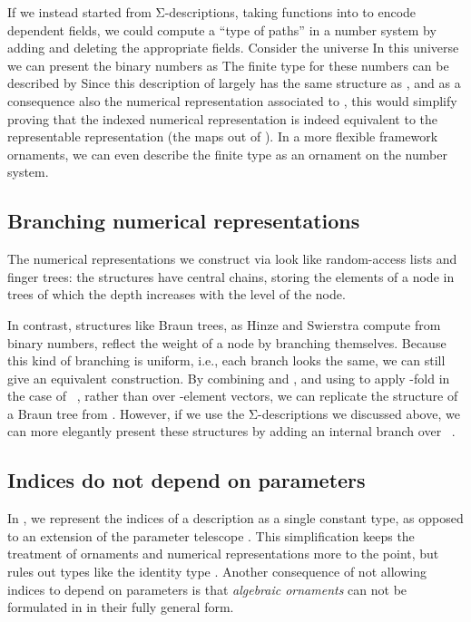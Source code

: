 If we instead started from Σ-descriptions, taking functions into  to encode dependent fields, we could compute a ``type of paths'' in a number system by adding and deleting the appropriate fields. Consider the universe
In this universe we can present the binary numbers as
The finite type for these numbers can be described by
Since this description of  largely has the same structure as , and as a consequence also the numerical representation associated to , this would simplify proving that the indexed numerical representation is indeed equivalent to the representable representation (the maps out of ). In a more flexible framework ornaments, we can even describe the finite type as an ornament on the number system.


\subsection{Branching numerical representations}
The numerical representations we construct via  look like random-access lists and finger trees: the structures have central chains, storing the elements of a node in trees of which the depth increases with the level of the node.

In contrast, structures like Braun trees, as Hinze and Swierstra \cite{calcdata} compute from binary numbers, reflect the weight of a node by branching themselves. Because this kind of branching is uniform, i.e., each branch looks the same, we can still give an equivalent construction. By combining  and , and using 
to apply  -fold in the case of \ , rather than over -element vectors, we can replicate the structure of a Braun tree from . However, if we use the Σ-descriptions we discussed above, we can more elegantly present these structures by adding an internal branch over \ .

\subsection{Indices do not depend on parameters}\label{sec:no-dep-ix}
In , we represent the indices of a description as a single constant type, as opposed to an extension of the parameter telescope \cite{practgen}. This simplification keeps the treatment of ornaments and numerical representations more to the point, but rules out types like the identity type . Another consequence of not allowing indices to depend on parameters is that \emph{algebraic ornaments} \cite{algorn} can not be formulated in  in their fully general form.

